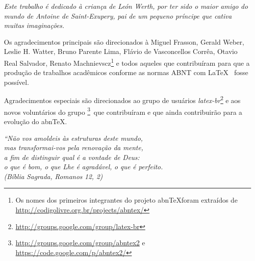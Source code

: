 \documentclass[12pt,openright,twoside,a4paper]{abntex2}
\begin{document}

\imprimircapa

\imprimirfolhaderosto*







\begin{dedicatoria}
   \vspace*{\fill}
\noindent\textit{Este trabalho é dedicado à criança de León Werth, por ter sido
o maior amigo do mundo de Antoine de Saint-Exupery, pai de um pequeno príncipe que cativa muitas
imaginações.}
 \vspace*{\fill}
\end{dedicatoria}

\begin{agradecimentos}
Os agradecimentos principais são direcionados à Miguel Frasson, Gerald Weber,
Leslie H. Watter, Bruno Parente Lima, Flávio de Vasconcellos Corrêa, Otavio Real
Salvador, Renato Machnievscz\footnote{Os nomes dos primeiros integrantes do
projeto abn\TeX foram extraídos de
\url{http://codigolivre.org.br/projects/abntex/}} e todos aqueles que
contribuíram para que a produção de trabalhos acadêmicos conforme
as normas ABNT com \LaTeX~ fosse possível.

Agradecimentos especiais são direcionados ao grupo de usuários
\emph{latex-br}\footnote{\url{http://groups.google.com/group/latex-br}} e aos
novos voluntários do grupo \emph{\abnTeX}
\footnote{\url{http://groups.google.com/group/abntex2} e
\url{https://code.google.com/p/abntex2/}}~que contribuíram e que ainda
contribuirão para a evolução do abn\TeX.
\end{agradecimentos}

\begin{epigrafe}
    \vspace*{\fill}
	\begin{flushright}
		\textit{``Não vos amoldeis às estruturas deste mundo, \\
		mas transformai-vos pela renovação da mente, \\
		a fim de distinguir qual é a vontade de Deus: \\
		o que é bom, o que Lhe é agradável, o que é perfeito.\\
		(Bíblia Sagrada, Romanos 12, 2)}
	\end{flushright}
\end{epigrafe}
\end{document}
